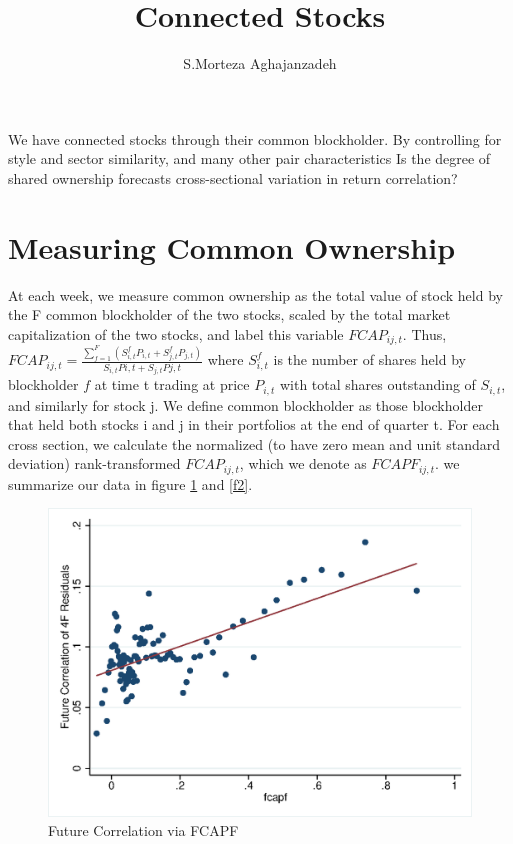 \documentclass[12pt]{article}
\begin{document}
\title{Connected Stocks}
\author{S.Morteza Aghajanzadeh}
\maketitle

We have connected stocks through their common blockholder. By controlling for style and sector similarity, and many other pair characteristics Is the degree of shared ownership forecasts cross-sectional variation in return correlation?

\section{Measuring Common Ownership}


At each week, we measure common ownership as the total value of stock held by the F common blockholder of the two stocks, scaled by the total market
capitalization of the two stocks, and label this variable $ FCAP_{ij,t} $.
Thus, $ FCAP_{ij,t} = \frac{\sum_{f = 1}^{F} (S^f_{i,t}P_{i,t}+S^f_{j,t}P_{j,t})}{S_{i,t}P{i,t} + S_{j,t}P{j,t}} $ where $ S^f_{i,t} $ is the number of shares held by blockholder $ f $ at time t trading at price $ P_{i,t} $ with total shares outstanding of $ S_{i,t} $, and similarly for stock j. We define common blockholder as those blockholder that held both stocks i and j in their portfolios at the end of quarter t. For each cross section, we calculate the
normalized (to have zero mean and unit standard deviation) rank-transformed  $ FCAP_{ij,t} $, which we denote as $ FCAPF_{ij,t} $.
we summarize our data in figure \ref{f1} and \ref{f2}.


\begin{figure}[htbp]
\centering
\includegraphics[width = 0.7\columnwidth ]{mygraph2.eps}
\caption{Future Correlation via FCAPF}
\label{f1}
\end{figure}
\end{document}
